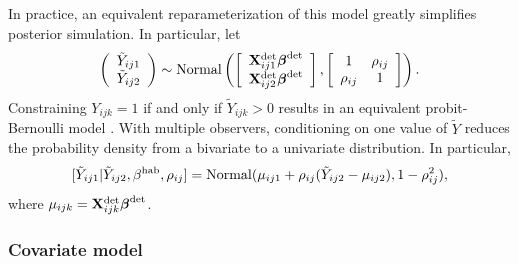 \documentclass[10pt]{article}
\begin{document}
In practice, an equivalent reparameterization of this model greatly simplifies posterior simulation. In particular, let
\begin{equation} \label{eq:obs.mod}
\left(\begin{array}{c}
				\tilde{Y}_{ij1} \\
				\tilde{Y}_{ij2}
		\end{array}\right) \sim {\rm Normal}
\left( \left[ \begin{array}{c}
				{\bf X}_{ij1}^{\rm det} \boldsymbol{\beta}^{\rm det}\\
				{\bf X}_{ij2}^{\rm det} \boldsymbol{\beta}^{\rm det}
		\end{array}\right],
        \left[ \begin{array}{cc}
            1 & \rho_{ij} \\
            \rho_{ij} & 1
        \end{array} \right]
\right).
\end{equation}
Constraining $Y_{ijk}=1$ if and only if $\tilde{Y}_{ijk}>0$ results in an equivalent probit-Bernoulli model  \cite{AlbertChib1993}.
With multiple observers, conditioning on one value of $\tilde{Y}$ reduces the probability density from a bivariate to a univariate distribution.  In particular,
\begin{equation}
\label{eq:biv_to_univ}
[\tilde{Y}_{ij1} | \tilde{Y}_{ij2},\beta^{\rm hab},\rho_{ij}]={\rm Normal}(\mu_{ij1}+\rho_{ij}(\tilde{Y}_{ij2}-\mu_{ij2}),1-\rho_{ij}^2),
\end{equation}
where $\mu_{ijk}={\bf X}_{ijk}^{\rm det} \boldsymbol{\beta}^{\rm det}$.

\subsubsection*{Covariate model}
\end{document}
